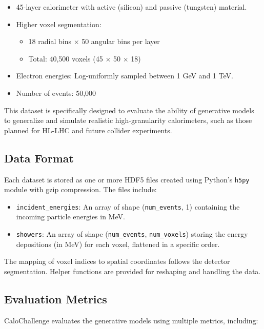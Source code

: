 \begin{itemize}
    \item 45-layer calorimeter with active (silicon) and passive (tungsten) material.
    \item Higher voxel segmentation:
    \begin{itemize}
        \item 18 radial bins $\times$ 50 angular bins per layer
        \item Total: 40,500 voxels (45 $\times$ 50 $\times$ 18)
    \end{itemize}
    \item Electron energies: Log-uniformly sampled between 1 GeV and 1 TeV.
    \item Number of events: 50,000
\end{itemize}

This dataset is specifically designed to evaluate the ability of generative models to generalize and simulate realistic high-granularity calorimeters, such as those planned for HL-LHC and future collider experiments.


\subsection{Data Format}

Each dataset is stored as one or more HDF5 files created using Python's \texttt{h5py} module with gzip compression. The files include:

\begin{itemize}
    \item \texttt{incident\_energies}: An array of shape (\texttt{num\_events}, 1) containing the incoming particle energies in MeV.
    \item \texttt{showers}: An array of shape (\texttt{num\_events}, \texttt{num\_voxels}) storing the energy depositions (in MeV) for each voxel, flattened in a specific order.
\end{itemize}

The mapping of voxel indices to spatial coordinates follows the detector segmentation. Helper functions are provided for reshaping and handling the data.

\subsection{Evaluation Metrics}

CaloChallenge evaluates the generative models using multiple metrics, including:

